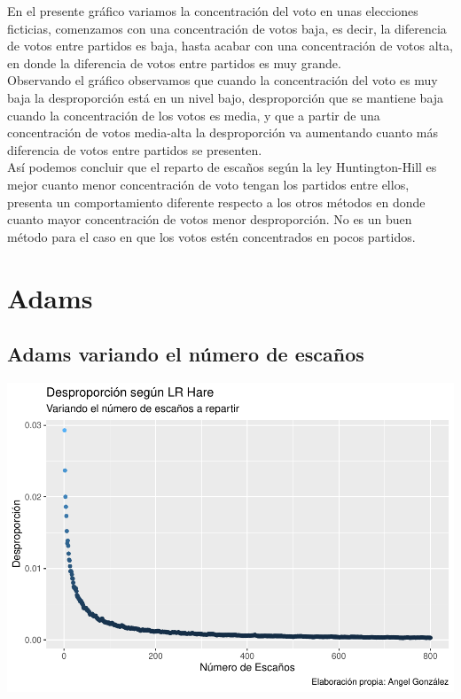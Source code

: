 \documentclass[12pt,a4paper,]{book}
\numberwithin{dummy}{section}
\theoremstyle{ocrenumbox}
\theoremstyle{blacknumex}
\theoremstyle{blacknumbox}
\theoremstyle{ocrenum}
\theoremstyle{ocrenum}
\begin{document}
En el presente gráfico variamos la concentración del voto en unas
elecciones ficticias, comenzamos con una concentración de votos baja, es
decir, la diferencia de votos entre partidos es baja, hasta acabar con
una concentración de votos alta, en donde la diferencia de votos entre
partidos es muy grande.\\
Observando el gráfico observamos que cuando la concentración del voto es
muy baja la desproporción está en un nivel bajo, desproporción que se
mantiene baja cuando la concentración de los votos es media, y que a
partir de una concentración de votos media-alta la desproporción va
aumentando cuanto más diferencia de votos entre partidos se presenten.\\
Así podemos concluir que el reparto de escaños según la ley
Huntington-Hill es mejor cuanto menor concentración de voto tengan los
partidos entre ellos, presenta un comportamiento diferente respecto a
los otros métodos en donde cuanto mayor concentración de votos menor
desproporción. No es un buen método para el caso en que los votos estén
concentrados en pocos partidos.

\hypertarget{adams}{%
\section{Adams}\label{adams}}

\hypertarget{adams-variando-el-nuxfamero-de-escauxf1os}{%
\subsection{Adams variando el número de
escaños}\label{adams-variando-el-nuxfamero-de-escauxf1os}}

\begin{center}\includegraphics[width=0.95\linewidth]{figurasR/unnamed-chunk-41-1} \end{center}
\end{document}
